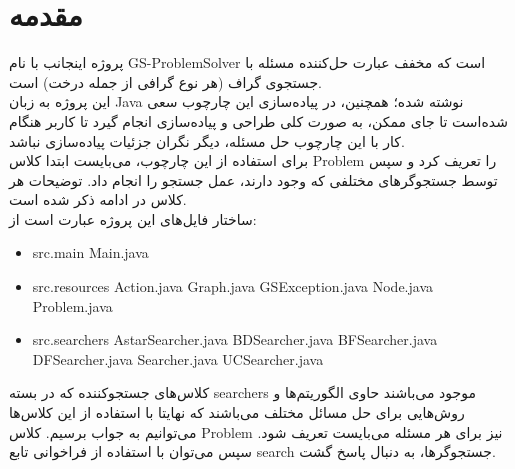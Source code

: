 \documentclass{report}
\theoremstyle{definition}
\begin{document}
	\section{مقدمه}
	پروژه اینجانب با نام
	GS-ProblemSolver
	است که مخفف عبارت حل‌کننده مسئله با جستجوی گراف (هر نوع گرافی از جمله درخت) است.\\
	این پروژه به زبان Java نوشته شده؛ همچنین، در پیاده‌سازی این چارچوب سعی شده‌است تا جای ممکن، به صورت کلی طراحی و پیاده‌سازی انجام گیرد تا کاربر هنگام کار با این چارچوب حل مسئله، دیگر نگران جزئیات پیاده‌سازی نباشد.\\
	برای استفاده از این چارچوب، می‌بایست ابتدا کلاس
	Problem
	را تعریف کرد و سپس توسط جستجوگرهای مختلفی که وجود دارند، عمل جستجو را انجام داد. توضیحات هر کلاس در ادامه ذکر شده است.\\
	ساختار فایل‌های این پروژه عبارت است از:
	\begin{latin}
			\begin{itemize}
				\item src.main
				\subitem Main.java
				\item src.resources
				\subitem Action.java
				\subitem Graph.java
				\subitem GSException.java
				\subitem Node.java
				\subitem Problem.java
				\item src.searchers
				\subitem AstarSearcher.java
				\subitem BDSearcher.java
				\subitem BFSearcher.java
				\subitem DFSearcher.java
				\subitem Searcher.java
				\subitem UCSearcher.java
			\end{itemize}
	\end{latin}
	کلاس‌های جستجوکننده که در بسته searchers موجود می‌باشند حاوی الگوریتم‌ها و روش‌هایی برای حل مسائل مختلف می‌باشند که نهایتا با استفاده از این کلاس‌ها می‌توانیم به جواب برسیم.
	کلاس Problem نیز برای هر مسئله می‌بایست تعریف شود. سپس می‌توان با استفاده از فراخوانی تابع search جستجوگرها، به دنبال پاسخ گشت.
\end{document}
